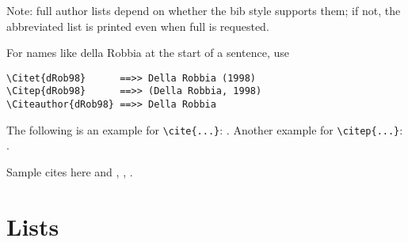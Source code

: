 \documentclass[numsec,webpdf,modern,medium,namedate]{oup-authoring-template}
\theoremstyle{thmstyleone}%
\theoremstyle{thmstyletwo}%
\theoremstyle{thmstylethree}%
\begin{document}
\noindent
Note: full author lists depend on whether the bib style supports them;
if not, the abbreviated list is printed even when full is requested.

\noindent
For names like della Robbia at the start of a sentence, use


{%
\begin{verbatim}
\Citet{dRob98}      ==>> Della Robbia (1998)
\Citep{dRob98}      ==>> (Della Robbia, 1998)
\Citeauthor{dRob98} ==>> Della Robbia
\end{verbatim}}


\noindent
The following is an example for \verb+\cite{...}+: \cite{rahman2019centroidb}. Another example for \verb+\citep{...}+: \citep{bahdanau2014neural,imboden2018cardiorespiratory,motiian2017unified,murphy2012machine,ji20123d}.

Sample cites here \citet{krizhevsky2012imagenet,horvath2018dna} and \citet{pyrkov2018quantitative}, \citep{wang2018face}, \citep{lecun2015deep,zhang2018fine,ravi2016deep}.


\section{Lists}\label{sec9}
\end{document}
